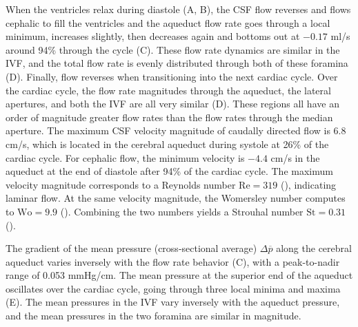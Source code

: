 \documentclass{template}
\begin{document}
When the ventricles relax during diastole (A, B),
the CSF flow reverses and flows cephalic to fill the ventricles
and the aqueduct flow rate goes through a local minimum, increases slightly,
then decreases again and bottoms out at $-0.17$ ml/s around
94\% through the cycle (C).
These flow rate dynamics are similar in the IVF,
and the total flow rate is evenly distributed through both of these foramina
(D).
Finally, flow reverses when transitioning 
into the next cardiac cycle. Over the cardiac cycle,
the flow rate magnitudes through the aqueduct,
the lateral apertures, and both the IVF
are all very similar (D).
These regions all have an order of magnitude greater
flow rates than the flow rates through the median aperture.
The maximum CSF velocity magnitude of caudally directed flow is 6.8 cm/s,
which is located in the cerebral aqueduct during systole at 26\% of the cardiac cycle.
For cephalic flow, the minimum velocity is $-4.4$ cm/s in the aqueduct at the end of diastole
after 94\% of the cardiac cycle. The maximum velocity magnitude corresponds to
a Reynolds number $\mathrm{Re}=319$ (), indicating laminar flow.
At the same velocity magnitude, the Womersley number computes to $\mathrm{Wo}=9.9$ ().
Combining the two numbers yields a Strouhal number $\mathrm{St}=0.31$ ().

The gradient of the mean pressure (cross-sectional average) $\Delta\overline{p}$
along the cerebral aqueduct varies inversely with
the flow rate behavior (C),
with a peak-to-nadir range of 0.053 mmHg/cm. The mean pressure
at the superior end of the aqueduct oscillates over the cardiac cycle,
going through three local minima and maxima (E).
The mean pressures in the IVF vary inversely with the aqueduct pressure, and the
mean pressures in the two foramina are similar in magnitude.
\end{document}
